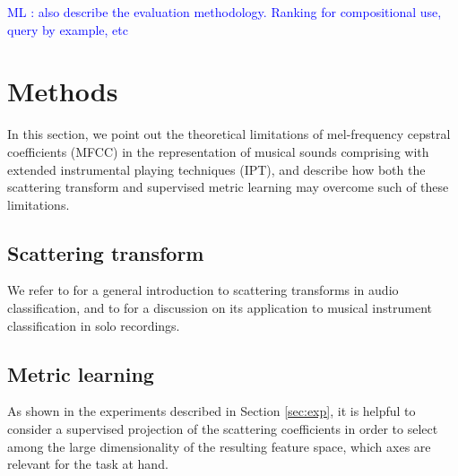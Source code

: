 \documentclass{article}
\newcommand{\ml}[1]{\textcolor{blue}{ML : #1}}
\begin{document}





\ml{also describe the evaluation methodology. Ranking for compositional use, query by example, etc}


\section{Methods}
In this section, we point out the theoretical limitations of mel-frequency cepstral coefficients (MFCC) in the representation of musical sounds comprising with extended instrumental playing techniques (IPT), and describe how both the scattering transform and supervised metric learning may overcome such of these limitations.


\subsection{Scattering transform} %


We refer to \cite{anden2014taslp} for a general introduction to scattering transforms in audio classification, and to \cite{lostanlen2017phd} for a discussion on its application to musical instrument classification in solo recordings.
\cite{anden2012dafx}

\subsection{Metric learning} %

As shown in the experiments described in Section \ref{sec:exp}, it is helpful to consider a supervised projection of the scattering coefficients in order to select among the large dimensionality of the resulting feature space, which axes are relevant for the task at hand.
\end{document}
